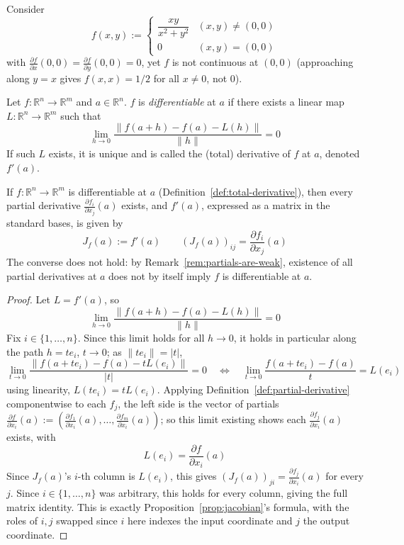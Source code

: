 		\begin{example}[Discontinuity]
			Consider
			\[
				f(x,y) := \begin{cases} \dfrac{xy}{x^2+y^2} & (x,y)\neq(0,0) \\ 0 & (x,y)=(0,0) \end{cases}
			\]
			with $\frac{\partial f}{\partial x}(0,0) = \frac{\partial f}{\partial y}(0,0) = 0$, yet $f$ is not continuous at $(0,0)$ (approaching along $y=x$ gives $f(x,x)=1/2$ for all $x\neq0$, not $0$).
		\end{example}
		
		\begin{definition}
			\label{def:total-derivative}
			Let $f:\mathbb{R}^n\to\mathbb{R}^m$ and $a\in\mathbb{R}^n$. $f$ is \emph{differentiable} at $a$ if there exists a linear map $L:\mathbb{R}^n\to\mathbb{R}^m$ such that
			\[
				\lim_{h\to0} \frac{\|f(a+h)-f(a)-L(h)\|}{\|h\|} = 0
			\]
			If such $L$ exists, it is unique and is called the (total) derivative of $f$ at $a$, denoted $f'(a)$.
		\end{definition}
		
		\begin{proposition}
			\label{prop:jacobian}
			If $f:\mathbb{R}^n\to\mathbb{R}^m$ is differentiable at $a$ (Definition~\ref{def:total-derivative}), then every partial derivative $\frac{\partial f_i}{\partial x_j}(a)$ exists, and $f'(a)$, expressed as a matrix in the standard bases, is given by
			\[
				J_f(a) := f'(a) \qquad (J_f(a))_{ij} = \frac{\partial f_i}{\partial x_j}(a)
			\]
			The converse does not hold: by Remark~\ref{rem:partials-are-weak}, existence of all partial derivatives at $a$ does not by itself imply $f$ is differentiable at $a$.
		\end{proposition}
		
		\begin{proof}
			Let $L=f'(a)$, so
			\[
				\lim_{h\to0} \frac{\|f(a+h)-f(a)-L(h)\|}{\|h\|} = 0
			\]
			Fix $i\in\{1,\dots,n\}$. Since this limit holds for all $h\to0$, it holds in particular along the path $h=te_i$, $t\to0$; as $\|te_i\|=|t|$,
			\[
				\lim_{t\to0} \frac{\|f(a+te_i)-f(a)-tL(e_i)\|}{|t|} = 0
				\quad\Longleftrightarrow\quad
				\lim_{t\to0} \frac{f(a+te_i)-f(a)}{t} = L(e_i)
			\]
			using linearity, $L(te_i)=tL(e_i)$. Applying Definition~\ref{def:partial-derivative} componentwise to each $f_j$, the left side is the vector of partials $\frac{\partial f}{\partial x_i}(a) := (\frac{\partial f_1}{\partial x_i}(a),\dots,\frac{\partial f_m}{\partial x_i}(a))$; so this limit existing shows each $\frac{\partial f_j}{\partial x_i}(a)$ exists, with
			\[
				L(e_i) = \frac{\partial f}{\partial x_i}(a)
			\]
			Since $J_f(a)$'s $i$-th column is $L(e_i)$, this gives $(J_f(a))_{ji} = \frac{\partial f_j}{\partial x_i}(a)$ for every $j$. Since $i\in\{1,\dots,n\}$ was arbitrary, this holds for every column, giving the full matrix identity. This is exactly Proposition~\ref{prop:jacobian}'s formula, with the roles of $i,j$ swapped since $i$ here indexes the input coordinate and $j$ the output coordinate.
		\end{proof}
		
